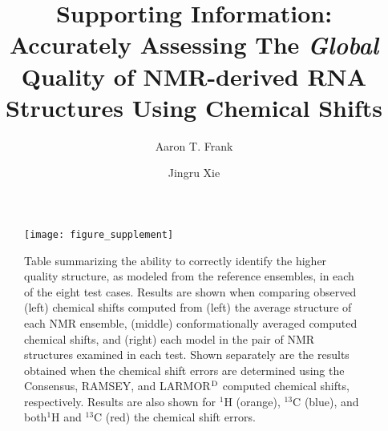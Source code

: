 \documentclass[fleqn,10pt]{wlscirep_atf}
\begin{document}
\title{Supporting Information: Accurately Assessing The \textit{Global} Quality of NMR-derived RNA Structures Using Chemical Shifts}

\author[1,2*]{Aaron T. Frank}
\author[3]{Jingru Xie}



\flushbottom
\maketitle


\begin{figure}[h]
\begin{center}
\texttt{[image: figure\_supplement]}
\end{center}
\caption{ Table summarizing the ability to correctly identify the higher quality structure, as modeled from the reference ensembles, in each of the eight test cases. Results are shown when comparing observed (left) chemical shifts computed from (left) the average structure of each NMR ensemble, (middle) conformationally averaged computed chemical shifts, and (right) each model in the pair of NMR structures examined in each test. Shown separately are the results obtained when the chemical shift errors are determined using the Consensus, RAMSEY, and LARMOR$^{\rm D}$ computed chemical shifts, respectively. Results are also shown for $^{1}$H (orange), $^{13}$C (blue), and both$^{1}$H and $^{13}$C (red) the chemical shift errors.}
\label{fig:supporting_tpr}
\end{figure}
\clearpage
\end{document}
